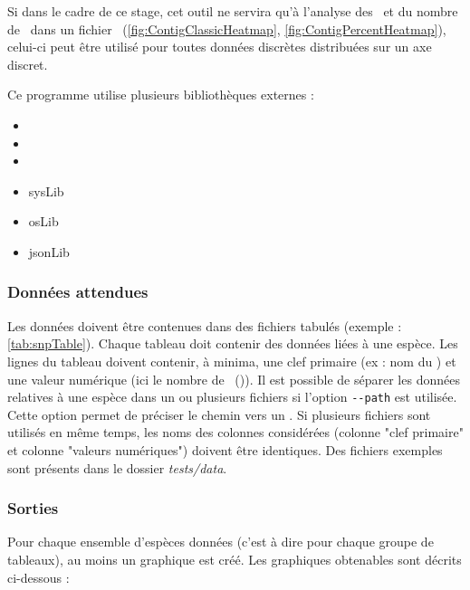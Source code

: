 \documentclass[../main]{subfiles} %
\begin{document}
Si dans le cadre de ce stage, cet outil ne servira qu'à l'analyse des \SNP et du nombre de \contigs dans un fichier \bam (\cref{fig:ContigClassicHeatmap}, \cref{fig:ContigPercentHeatmap}), celui-ci peut être utilisé pour toutes données discrètes distribuées sur un axe discret.

Ce programme utilise plusieurs bibliothèques externes : 
\begin{multicols}{3}
    \begin{itemize}
        \item \pytest
        \item \MatPlotLib
        \item \getopts
        \item \gls{sysLib}
        \item \gls{osLib}
        \item \gls{jsonLib}
    \end{itemize}
\end{multicols}

\subsubsection{Données attendues}
Les données doivent être contenues dans des fichiers tabulés (exemple : \cref{tab:snpTable}). Chaque tableau doit contenir des données liées à une espèce. Les lignes du tableau doivent contenir, à minima, une clef primaire (ex : nom du \contig) et une valeur numérique (ici le nombre de \SNP (\NbSNP)). Il est possible de séparer les données relatives à une espèce dans un ou plusieurs fichiers si l’option \lstinline{--path} est utilisée. Cette option permet de préciser le chemin vers un \json. Si plusieurs fichiers sont utilisés en même temps, les noms des colonnes considérées (colonne "clef primaire" et colonne "valeurs numériques") doivent être identiques. Des fichiers exemples sont présents dans le dossier \textit{tests/data}.



\subsubsection{Sorties}
Pour chaque ensemble d’espèces données (c’est à dire pour chaque groupe de tableaux), au moins un graphique est créé. Les graphiques obtenables sont décrits ci-dessous :
\end{document}
